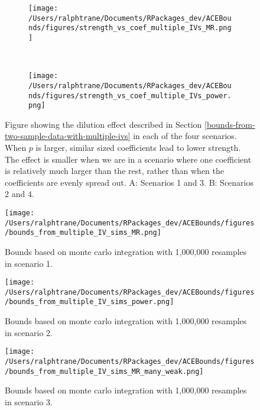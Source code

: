 \documentclass[
]{article}
\theoremstyle{plain}
\begin{document}
\begin{figure*}
  \centering
  \begin{subfigure}{0.5\linewidth}
  \caption{}
  \texttt{[image: /Users/ralphtrane/Documents/RPackages\_dev/ACEBounds/figures/strength\_vs\_coef\_multiple\_IVs\_MR.png]}
  \label{fig:strength_vs_coef_multiple_IVs_MR}
  \end{subfigure}%
  ~
  \begin{subfigure}{0.5\linewidth}
  \caption{}
  \texttt{[image: /Users/ralphtrane/Documents/RPackages\_dev/ACEBounds/figures/strength\_vs\_coef\_multiple\_IVs\_power.png]}
  \label{fig:strength_vs_coef_multiple_IVs_power}
  \end{subfigure}
  \caption{Figure showing the dilution effect described in Section \ref{bounds-from-two-sample-data-with-multiple-ivs} in each of the four scenarios. When $p$ is larger, similar sized coefficients lead to lower strength. The effect is smaller when we are in a scenario where one coefficient is relatively much larger than the rest, rather than when the coefficients are evenly spread out. A: Scenarios 1 and 3. B: Scenarios 2 and 4.}
  \label{fig:strength_vs_coef_multiple_IVs}
\end{figure*}

\clearpage

\begin{sidewaysfigure}
  \centering
  \texttt{[image: /Users/ralphtrane/Documents/RPackages\_dev/ACEBounds/figures/bounds\_from\_multiple\_IV\_sims\_MR.png]}
  \caption{Bounds based on monte carlo integration with 1,000,000 resamples in scenario 1.}
  \label{fig:bounds_from_multiple_IV_sims_MR}
\end{sidewaysfigure}

\clearpage

\begin{sidewaysfigure}
  \centering
  \texttt{[image: /Users/ralphtrane/Documents/RPackages\_dev/ACEBounds/figures/bounds\_from\_multiple\_IV\_sims\_power.png]}
  \caption{Bounds based on monte carlo integration with 1,000,000 resamples in scenario 2.}
  \label{fig:bounds_from_multiple_IV_sims_power}
\end{sidewaysfigure}

\clearpage

\begin{sidewaysfigure}
  \centering
  \texttt{[image: /Users/ralphtrane/Documents/RPackages\_dev/ACEBounds/figures/bounds\_from\_multiple\_IV\_sims\_MR\_many\_weak.png]}
  \caption{Bounds based on monte carlo integration with 1,000,000 resamples in scenario 3.}
  \label{fig:bounds_from_multiple_IV_sims_MR_many_weak}
\end{sidewaysfigure}
\end{document}
